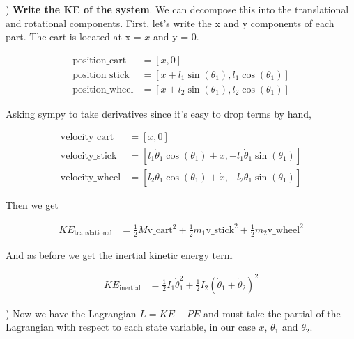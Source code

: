 \documentclass[conference]{IEEEtran}
\begin{document}
) \textbf{Write the KE of the system}. We can decompose this into the translational and
rotational components. First, let's write the x and y components of each part.
The cart is located at x = $x$ and y = 0.

\begin{align}
    \text{position\_cart} &= [x, 0] \\
    \text{position\_stick} &= [x + l_1 \sin(\theta_1), l_1 \cos(\theta_1)] \\
    \text{position\_wheel} &= [x + l_2 \sin(\theta_1), l_2 \cos(\theta_1)]
\end{align}


Asking sympy to take derivatives since it's easy to drop terms by hand,

\begin{align}
    \text{velocity\_cart} &= [\dot x, 0] \\
    \text{velocity\_stick} &= [l_1 \dot\theta_1 \cos(\theta_1) + \dot x, - l_1 \dot\theta_1 \sin(\theta_1)] \\
    \text{velocity\_wheel} &= [l_2 \dot\theta_1 \cos(\theta_1) + \dot x, -l_2 \dot\theta_1 \sin(\theta_1)]
\end{align}

Then we get

\begin{align}
    KE_{\text{translational}} &= \frac{1}{2} M \text{v\_cart}^2 + \frac{1}{2} m_1 \text{v\_stick}^2 + \frac{1}{2} m_2 \text{v\_wheel}^2
\end{align}

And as before we get the inertial kinetic energy term

\begin{align}
    KE_{\text{inertial}} &= \frac{1}{2} I_1 \dot\theta_1^2 + \frac{1}{2} I_2 (\dot\theta_1 + \dot\theta_2)^2
\end{align}


) Now we have the Lagrangian $L = KE - PE$ and must take the partial of the Lagrangian with
respect to each state variable, in our case $x$, $\theta_1$ and $\theta_2$.
\end{document}
